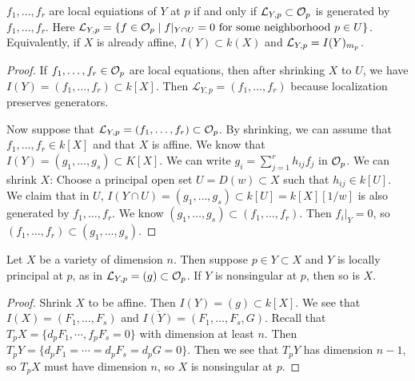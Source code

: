 \documentclass[twoside, 10pt]{article}
\begin{document}
    \begin{lem} $f_1, \ldots, f_r$ are local equiations of $Y$ at $p$ if and
        only if $\mathcal{L}_{Y,p} \subset \mathcal{O}_p$ is generated by $f_1, \ldots,
        f_r$.  Here $\mathcal{L}_{Y,p} = \{f \in \mathcal{O}_p \mid f|_{Y \cap U} = 0
        \text{ for some neighborhood } p \in U \}$. Equivalently, if $X$ is
        already affine, $I(Y) \subset k(X)$ and $\mathcal{L}_{Y,p} = I(Y)_{m_p}$.
        \begin{proof} If $f_1, \ldots, f_r \in \mathcal{O}_p$ are local equations,
            then after shrinking $X$ to $U$, we have $I(Y) = (f_1, \ldots, f_r)
            \subset k[X]$. Then $\mathcal{L}_{Y,p} = (f_1, \ldots, f_r)$
            because localization preserves generators.

            Now suppose that $\mathcal{L}_{Y,p} = (f_1, \ldots, f_r) \subset
            \mathcal{O}_p$. By shrinking, we can assume that $f_1, \ldots, f_r \in
            k[X]$ and that $X$ is affine. We know that $I(Y) = (g_1, \ldots,
            g_s) \subset K[X]$. We can write $g_i = \sum_{j=1}^r h_{ij}f_j$ in
            $\mathcal{O}_p$. We can shrink $X$: Choose a principal open set $U =
            D(w) \subset X$ such that $h_{ij} \in k[U]$. We claim that in $U$,
            $I(Y \cap U) = (g_1, \ldots, g_s) \subset k[U]= k[X][1/w]$ is also
            generated by $f_1, \ldots, f_r$. We know $(g_1, \ldots, g_s)
            \subset (f_1, \ldots, f_r).$ Then $f_i|_Y = 0$, so $(f_1, \ldots,
            f_r) \subset (g_1, \ldots, g_s)$.  \end{proof} \end{lem}
    
    \begin{thm} Let $X$ be a variety of dimension
        $n$. Then suppose $p \in Y \subset X$ and $Y$ is locally principal at
        $p$, as in $\mathcal{L}_{Y,p} = (g) \subset \mathcal{O}_p$. If $Y$ is nonsingular
        at $p$, then so is $X$.  \begin{proof} Shrink $X$ to be affine. Then
            $I(Y) = (g) \subset k[X]$. We see that $I(X) = (F_1, \ldots, F_s)$
            and $\overline{I(Y)} = (F_1, \ldots, F_s, G)$. Recall that $T_pX =
            \{d_pF_1, \cdots, f_pF_s = 0 \}$ with dimension at least $n$. Then
            $T_pY = \{d_pF_1 = \cdots = d_pF_s = d_pG = 0\}$. Then we see that
            $T_pY$ has dimension $n-1$, so $T_pX$ must have dimension $n$, so
            $X$ is nonsingular at $p$.  \end{proof} \end{thm}
    
\end{document}
